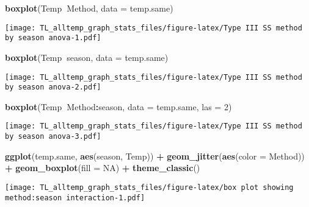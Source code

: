 \documentclass[
]{article}
\newenvironment{Shaded}{\begin{snugshade}}{\end{snugshade}}
\newcommand{\DataTypeTok}[1]{\textcolor[rgb]{0.13,0.29,0.53}{#1}}
\newcommand{\DecValTok}[1]{\textcolor[rgb]{0.00,0.00,0.81}{#1}}
\newcommand{\KeywordTok}[1]{\textcolor[rgb]{0.13,0.29,0.53}{\textbf{#1}}}
\newcommand{\NormalTok}[1]{#1}
\newcommand{\OperatorTok}[1]{\textcolor[rgb]{0.81,0.36,0.00}{\textbf{#1}}}
\newcommand{\OtherTok}[1]{\textcolor[rgb]{0.56,0.35,0.01}{#1}}
\newcommand{\StringTok}[1]{\textcolor[rgb]{0.31,0.60,0.02}{#1}}
\begin{document}
\begin{Shaded}
\begin{Highlighting}[]
\KeywordTok{boxplot}\NormalTok{(Temp}\OperatorTok{~}\NormalTok{Method, }\DataTypeTok{data =}\NormalTok{ temp.same)}
\end{Highlighting}
\end{Shaded}

\texttt{[image: TL\_alltemp\_graph\_stats\_files/figure-latex/Type III SS method by season anova-1.pdf]}

\begin{Shaded}
\begin{Highlighting}[]
\KeywordTok{boxplot}\NormalTok{(Temp}\OperatorTok{~}\NormalTok{season, }\DataTypeTok{data =}\NormalTok{ temp.same)}
\end{Highlighting}
\end{Shaded}

\texttt{[image: TL\_alltemp\_graph\_stats\_files/figure-latex/Type III SS method by season anova-2.pdf]}

\begin{Shaded}
\begin{Highlighting}[]
\KeywordTok{boxplot}\NormalTok{(Temp}\OperatorTok{~}\NormalTok{Method}\OperatorTok{:}\NormalTok{season, }\DataTypeTok{data =}\NormalTok{ temp.same, }\DataTypeTok{las =} \DecValTok{2}\NormalTok{)}
\end{Highlighting}
\end{Shaded}

\texttt{[image: TL\_alltemp\_graph\_stats\_files/figure-latex/Type III SS method by season anova-3.pdf]}

\begin{Shaded}
\begin{Highlighting}[]
\KeywordTok{ggplot}\NormalTok{(temp.same, }\KeywordTok{aes}\NormalTok{(season, Temp)) }\OperatorTok{+}\StringTok{ }
\StringTok{   }\KeywordTok{geom_jitter}\NormalTok{(}\KeywordTok{aes}\NormalTok{(}\DataTypeTok{color =}\NormalTok{ Method)) }\OperatorTok{+}
\StringTok{   }\KeywordTok{geom_boxplot}\NormalTok{(}\DataTypeTok{fill =} \OtherTok{NA}\NormalTok{) }\OperatorTok{+}\StringTok{ }
\StringTok{   }\KeywordTok{theme_classic}\NormalTok{()}
\end{Highlighting}
\end{Shaded}

\texttt{[image: TL\_alltemp\_graph\_stats\_files/figure-latex/box plot showing method:season interaction-1.pdf]}

\begin{Shaded}
\end{Shaded}
\end{document}
